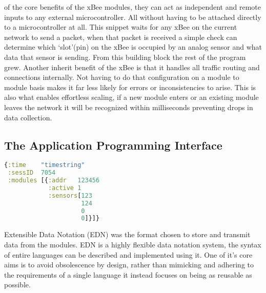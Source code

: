 

 of the core benefits of the xBee modules, they can act as independent and remote inputs to any external microcontroller. All without having to be attached directly to a microcontroller at all. This snippet waits for any xBee on the current network to send a packet, when that packet is received a simple check can determine which `slot'(pin) on the xBee is occupied by an analog sensor and what data that sensor is sending. From this building block the rest of the program grew.
Another inherit benefit of the xBee is that it handles all traffic routing and connections internally. Not having to do that configuration on a module to module basis makes it far less likely for errors or inconsistencies to arise. This is also what enables effortless scaling, if a new module enters or an existing module leaves the network it will be recognized within milliseconds preventing drops in data collection.  

\FloatBarrier
\subsection{The Application Programming Interface}\label{subsec:api}


\begin{lstlisting}[language=clojure,frame=left]
{:time    "timestring"
 :sessID  7054
 :modules [{:addr   123456
            :active 1
            :sensors[123 
                     124 
                     0 
                     0]}]}
\end{lstlisting}

Extensible Data Notation (EDN) was the format chosen to store and transmit data from the modules. EDN is a highly flexible data notation system, the syntax of entire languages can be described and implemented using it. One of it's core aims is to avoid obsolescence by design, rather than mimicking and adhering to the requirements of a single language it instead focuses on being as reusable as possible.


